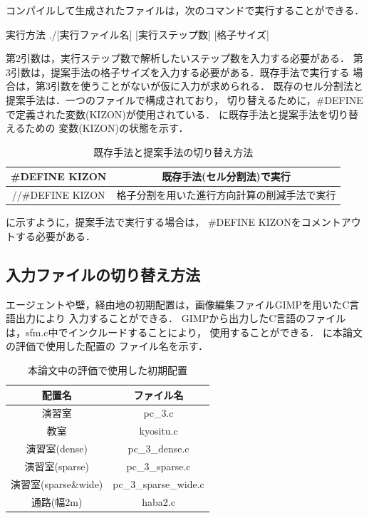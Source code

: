 コンパイルして生成されたファイルは，次のコマンドで実行することができる．
\begin{itembox}[l]{実行方法}
./[実行ファイル名] [実行ステップ数] [格子サイズ]
\end{itembox}
第2引数は，実行ステップ数で解析したいステップ数を入力する必要がある．
第3引数は，提案手法の格子サイズを入力する必要がある．既存手法で実行する
場合は，第3引数を使うことがないが仮に入力が求められる．
既存のセル分割法と提案手法は．一つのファイルで構成されており，
切り替えるために，\#DEFINEで定義された変数(KIZON)が使用されている．
に既存手法と提案手法を切り替えるための
変数(KIZON)の状態を示す．
%
\begin{table}[H]
  \begin{center}
    \caption{既存手法と提案手法の切り替え方法}
    \label{tb:toggle_kizon}
    \begin{tabular}{c|c}
      \hline \hline
      \#DEFINE KIZON     & 既存手法(セル分割法)で実行 \\ \hline
      //\#DEFINE KIZON & 格子分割を用いた進行方向計算の削減手法で実行\\ \hline
    \end{tabular}
  \end{center}
\end{table}
%
に示すように，提案手法で実行する場合は，
\#DEFINE KIZONをコメントアウトする必要がある．

\subsection{入力ファイルの切り替え方法}
エージェントや壁，経由地の初期配置は，画像編集ファイルGIMPを用いたC言語出力により
入力することができる．
GIMPから出力したC言語のファイルは，sfm.c中でインクルードすることにより，
使用することができる．
に本論文の評価で使用した配置の
ファイル名を示す．

\begin{table}[H]
  \begin{center}
    \caption{本論文中の評価で使用した初期配置}
    \label{tb:arrangement_gimp_files}
    \begin{tabular}{c|c}
      \hline \hline
      配置名 & ファイル名 \\ \hline
      演習室 & pc\_3.c \\ \hline
      教室 & kyositu.c \\ \hline
      演習室(dense) & pc\_3\_dense.c \\ \hline
      演習室(sparse) & pc\_3\_sparse.c \\ \hline
      演習室(sparse\&wide) & pc\_3\_sparse\_wide.c \\ \hline
      通路(幅2m) & haba2.c \\ \hline
    \end{tabular}
  \end{center}
\end{table}


